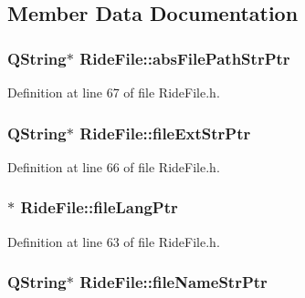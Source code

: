 \subsection{Member Data Documentation}
\hypertarget{class_ride_file_a48f3da6d11df5097b65290213c050a28}{
\subsubsection[{abs\-File\-Path\-Str\-Ptr}]{\setlength{\rightskip}{0pt plus 5cm}Q\-String$\ast$ Ride\-File\-::abs\-File\-Path\-Str\-Ptr\hspace{0.3cm}{\ttfamily [private]}}}\label{class_ride_file_a48f3da6d11df5097b65290213c050a28}


Definition at line 67 of file Ride\-File.\-h.

\hypertarget{class_ride_file_a29d334700d1480159fc69b59f7dc02a8}{
\subsubsection[{file\-Ext\-Str\-Ptr}]{\setlength{\rightskip}{0pt plus 5cm}Q\-String$\ast$ Ride\-File\-::file\-Ext\-Str\-Ptr\hspace{0.3cm}{\ttfamily [private]}}}\label{class_ride_file_a29d334700d1480159fc69b59f7dc02a8}


Definition at line 66 of file Ride\-File.\-h.

\hypertarget{class_ride_file_acbfd3155fd50ad8fa0711ae3e452f372}{
\subsubsection[{file\-Lang\-Ptr}]{$\ast$ Ride\-File\-::file\-Lang\-Ptr\hspace{0.3cm}{\ttfamily [private]}}}\label{class_ride_file_acbfd3155fd50ad8fa0711ae3e452f372}


Definition at line 63 of file Ride\-File.\-h.

\hypertarget{class_ride_file_a6eeba18da5e7d5e7b3afde7c65bd1f7a}{
\subsubsection[{file\-Name\-Str\-Ptr}]{\setlength{\rightskip}{0pt plus 5cm}Q\-String$\ast$ Ride\-File\-::file\-Name\-Str\-Ptr\hspace{0.3cm}{\ttfamily [private]}}}\label{class_ride_file_a6eeba18da5e7d5e7b3afde7c65bd1f7a}


